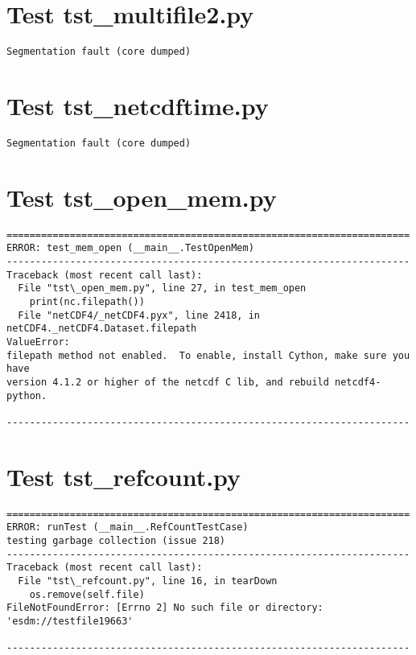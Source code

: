 \section{Test tst\_multifile2.py}

\begin{verbatim}
Segmentation fault (core dumped)
\end{verbatim}

\section{Test tst\_netcdftime.py}

\begin{verbatim}
Segmentation fault (core dumped)
\end{verbatim}

\section{Test tst\_open\_mem.py}

\begin{verbatim}
======================================================================
ERROR: test_mem_open (__main__.TestOpenMem)
----------------------------------------------------------------------
Traceback (most recent call last):
  File "tst\_open_mem.py", line 27, in test_mem_open
    print(nc.filepath())
  File "netCDF4/_netCDF4.pyx", line 2418, in netCDF4._netCDF4.Dataset.filepath
ValueError:
filepath method not enabled.  To enable, install Cython, make sure you have
version 4.1.2 or higher of the netcdf C lib, and rebuild netcdf4-python.

----------------------------------------------------------------------
\end{verbatim}

\section{Test tst\_refcount.py}

\begin{verbatim}
======================================================================
ERROR: runTest (__main__.RefCountTestCase)
testing garbage collection (issue 218)
----------------------------------------------------------------------
Traceback (most recent call last):
  File "tst\_refcount.py", line 16, in tearDown
    os.remove(self.file)
FileNotFoundError: [Errno 2] No such file or directory: 'esdm://testfile19663'

----------------------------------------------------------------------
\end{verbatim}

